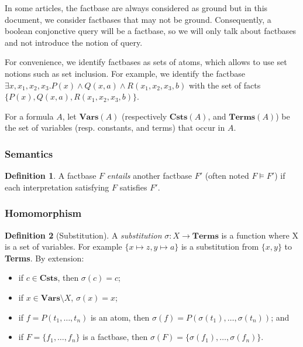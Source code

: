 \documentclass{article}
\theoremstyle{definition}
\newtheorem{definition}{Definition}[section]
\theoremstyle{remark}
\newcommand{\Vars}{\textbf{Vars}}
\newcommand{\Terms}{\textbf{Terms}}
\newcommand{\Csts}{\textbf{Csts}}
\begin{document}
In some articles, the factbase are always considered as ground but in this document, we consider factbases that may not be ground. Consequently, a  boolean conjonctive query will be a factbase, so we will only talk about factbases and not introduce the notion of query.

For convenience, we identify factbases as sets of atoms, which allows to  use  set  notions  such  as  set inclusion. For example, we identify the factbase $\exists x,x_{1},x_{2},x_{3}. P(x) \land Q(x,a) \land R(x_{1},x_{2},x_{3},b)$ with the set of facts $\{P(x),Q(x,a),R(x_{1},x_{2},x_{3},b)\}$.

For a formula $A$, let \emph{$\Vars(A)$} (respectively \emph{$\Csts(A)$}, and \emph{$\Terms(A)$}) be the set of variables (resp. constants, and terms) that occur in $A$.

\subsubsection{Semantics}

\begin{definition}
A factbase $F$ \emph{entails} another factbase $F'$ (often noted $F \models F'$) if each interpretation satisfying $F$ satisfies $F'$.
\end{definition}	

\subsubsection{Homomorphism}

\begin{definition}[Substitution]
A \emph{substitution} $\sigma:X \to \Terms$ is a function where X is a set of variables. For example $\{x \mapsto z, y \mapsto a \}$ is a substitution from $\{x,y\}$ to \Terms. By extension: 
\begin{itemize}
\item if $c \in \Csts$, then $\sigma(c) = c$;
\item if $x \in \Vars \setminus X$, $\sigma(x) = x$;
\item if $f = P(t_1,\ldots,t_n)$ is an atom, then $\sigma(f) = P(\sigma(t_1),\ldots,\sigma(t_n))$; and
\item if $F = \{f_1,\ldots,f_n\}$ is a factbase, then $\sigma(F) = \{\sigma(f_1),\ldots,\sigma(f_n)\}$.
\end{itemize}
\end{definition}
\end{document}
